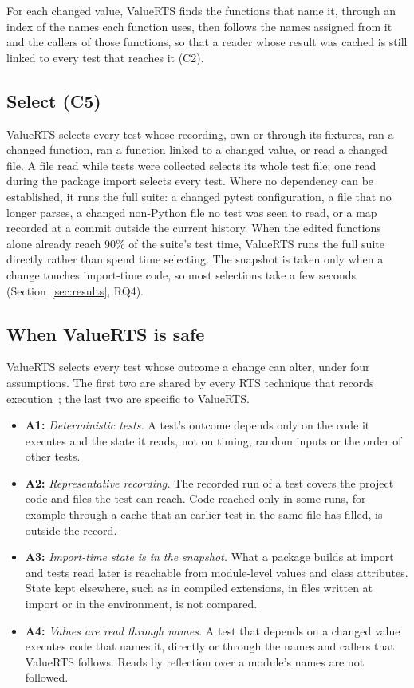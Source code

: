 \documentclass[acmsmall,screen,review,anonymous]{acmart}
\newcommand{\tool}{ValueRTS\xspace}
\begin{document}
For each changed value, \tool finds the functions that name it, through an index of the names each function uses, then follows the names assigned from it and the callers of those functions, so that a reader whose result was cached is still linked to every test that reaches it (C2).


\subsection{Select (C5)}
\tool selects every test whose recording, own or through its fixtures, ran a changed function, ran a function linked to a changed value, or read a changed file. A file read while tests were collected selects its whole test file; one read during the package import selects every test. Where no dependency can be established, it runs the full suite: a changed pytest configuration, a file that no longer parses, a changed non-Python file no test was seen to read, or a map recorded at a commit outside the current history. When the edited functions alone already reach 90\% of the suite's test time, \tool runs the full suite directly rather than spend time selecting. The snapshot is taken only when a change touches import-time code, so most selections take a few seconds (Section~\ref{sec:results}, RQ4).


\subsection{When \tool is safe}
\tool selects every test whose outcome a change can alter, under four assumptions. The first two are shared by every RTS technique that records execution~\cite{gligoric2015ekstazi}; the last two are specific to \tool.

\begin{itemize}
  \item \textbf{A1:} \emph{Deterministic tests.} A test's outcome depends only on the code it executes and the state it reads, not on timing, random inputs or the order of other tests.
  \item \textbf{A2:} \emph{Representative recording.} The recorded run of a test covers the project code and files the test can reach. Code reached only in some runs, for example through a cache that an earlier test in the same file has filled, is outside the record.
  \item \textbf{A3:} \emph{Import-time state is in the snapshot.} What a package builds at import and tests read later is reachable from module-level values and class attributes. State kept elsewhere, such as in compiled extensions, in files written at import or in the environment, is not compared.
  \item \textbf{A4:} \emph{Values are read through names.} A test that depends on a changed value executes code that names it, directly or through the names and callers that \tool follows. Reads by reflection over a module's names are not followed.
\end{itemize}
\end{document}
